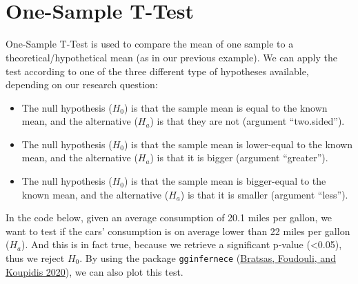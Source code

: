 \documentclass[
]{svmono}
\newenvironment{Shaded}{\begin{snugshade}}{\end{snugshade}}
\newcommand{\CommentTok}[1]{\textcolor[rgb]{0.56,0.35,0.01}{\textit{#1}}}
\newcommand{\FunctionTok}[1]{\textcolor[rgb]{0.13,0.29,0.53}{\textbf{#1}}}
\newcommand{\NormalTok}[1]{#1}
\newcommand{\SpecialCharTok}[1]{\textcolor[rgb]{0.81,0.36,0.00}{\textbf{#1}}}
\providecommand{\tightlist}{%
  \setlength{\itemsep}{0pt}\setlength{\parskip}{0pt}}
\begin{document}
\begin{Shaded}
\end{Shaded}

~

~
~

\hypertarget{one-sample-t-test}{%
\section{One-Sample T-Test}\label{one-sample-t-test}}

One-Sample T-Test is used to compare the mean of one sample to a
theoretical/hypothetical mean (as in our previous example). We can apply
the test according to one of the three different type of hypotheses
available, depending on our research question:

\begin{itemize}
\tightlist
\item
  The null hypothesis (\(H_0\)) is that the sample mean is equal to the
  known mean, and the alternative (\(H_a\)) is that they are not
  (argument ``two.sided'').
\item
  The null hypothesis (\(H_0\)) is that the sample mean is lower-equal
  to the known mean, and the alternative (\(H_a\)) is that it is bigger
  (argument ``greater'').
\item
  The null hypothesis (\(H_0\)) is that the sample mean is bigger-equal
  to the known mean, and the alternative (\(H_a\)) is that it is smaller
  (argument ``less'').
\end{itemize}

In the code below, given an average consumption of 20.1 miles per
gallon, we want to test if the cars' consumption is on average lower
than 22 miles per gallon (\(H_a\)). And this is in fact true, because we
retrieve a significant p-value (\textless0.05), thus we reject \(H_0\). By using
the package \texttt{gginfernece} (\protect\hyperlink{ref-bratsas2020}{Bratsas, Foudouli, and Koupidis 2020}), we can also plot this test.
\end{document}
